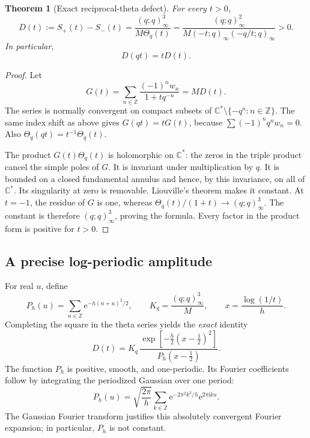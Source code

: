 \documentclass[11pt,a4paper]{article}
\numberwithin{equation}{section}
\newtheorem{theorem}{Theorem}[section]
\theoremstyle{definition}
\theoremstyle{remark}
\newcommand{\C}{\mathbb C}
\newcommand{\Z}{\mathbb Z}
\newcommand{\ii}{\mathrm i}
\newcommand{\ee}{\mathrm e}
\begin{document}
\begin{theorem}[Exact reciprocal-theta defect]
\label{thm:theta-defect}
For every \(t>0\),
\begin{equation}
 D(t):=S_+(t)-S_-(t)
 =\frac{(q;q)_\infty^3}{M\Theta_q(t)}
 =\frac{(q;q)_\infty^2}
 {M(-t;q)_\infty(-q/t;q)_\infty}>0.
 \label{eq:theta-defect}
\end{equation}
In particular,
\begin{equation}
 D(qt)=tD(t).
 \label{eq:defect-q}
\end{equation}
\end{theorem}
\begin{proof}
Let
\[
 G(t)=\sum_{n\in\Z}\frac{(-1)^nw_n}{1+tq^{-n}}=MD(t).
\]
The series is normally convergent on compact subsets of
\(\C^*\setminus\{-q^n:n\in\Z\}\). The same index shift as above gives
\(G(qt)=tG(t)\), because \(\sum(-1)^nq^nw_n=0\).
Also \(\Theta_q(qt)=t^{-1}\Theta_q(t)\).

The product \(G(t)\Theta_q(t)\) is holomorphic on \(\C^*\): the zeros
in the triple product cancel the simple poles of \(G\). It is invariant
under multiplication by \(q\). It is bounded on a closed fundamental
annulus and hence, by this invariance, on all of \(\C^*\). Its
singularity at zero is removable. Liouville's theorem makes it constant.
At \(t=-1\), the residue of \(G\) is one, whereas
\(\Theta_q(t)/(1+t)\to(q;q)_\infty^3\).
The constant is therefore \((q;q)_\infty^3\), proving the formula.
Every factor in the product form is positive for \(t>0\).
\end{proof}

\subsection{A precise log-periodic amplitude}
For real \(u\), define
\begin{equation}
 P_h(u)=\sum_{n\in\Z}\ee^{-h(n+u)^2/2},\qquad
 K_q=\frac{(q;q)_\infty^3}{M},\qquad
 x=\frac{\log(1/t)}h.
 \label{eq:periodic}
\end{equation}
Completing the square in the theta series yields the \emph{exact}
identity
\begin{equation}
 D(t)=K_q\,
 \frac{\exp[-\frac h2(x-\frac12)^2]}{P_h(x-\frac12)}.
 \label{eq:theta-gaussian}
\end{equation}
The function \(P_h\) is positive, smooth, and one-periodic. Its Fourier
coefficients follow by integrating the periodized Gaussian over one
period:
\begin{equation}
 P_h(u)=\sqrt{\frac{2\pi}{h}}
 \sum_{k\in\Z}\ee^{-2\pi^2k^2/h}\ee^{2\pi\ii ku}.
 \label{eq:poisson}
\end{equation}
The Gaussian Fourier transform justifies this absolutely convergent
Fourier expansion; in particular, \(P_h\) is not constant.
\end{document}
